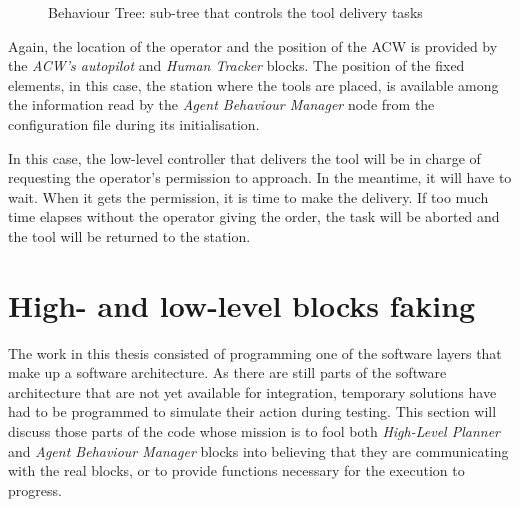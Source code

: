 \documentclass[fontsize=11pt, English=false, Español=true, Myfinal=true, twoside, numbers=noenddot]{scrbook}
\begin{document}
{\begin{figure}[ht]
\begin{center}
{\begin{tikzpicture}
		    \end{tikzpicture}}
		\caption{Behaviour Tree: sub-tree that controls the tool delivery tasks}
		\label{fig:DeliverToolTree}
	\end{center}
\end{figure}

Again, the location of the operator and the position of the \gls{ACW} is provided by the \emph{\gls{ACW}'s autopilot} and \emph{Human Tracker} blocks. The position of the fixed elements, in this case, the station where the tools are placed, is available among the information read by the \emph{Agent Behaviour Manager} node from the configuration file during its initialisation.

In this case, the low-level controller that delivers the tool will be in charge of requesting the operator's permission to approach. In the meantime, it will have to wait. When it gets the permission, it is time to make the delivery. If too much time elapses without the operator giving the order, the task will be aborted and the tool will be returned to the station.

\section{High- and low-level blocks faking}
\label{sec:faking}
The work in this thesis consisted of programming one of the software layers that make up a software architecture. As there are still parts of the software architecture that are not yet available for integration, temporary solutions have had to be programmed to simulate their action during testing. This section will discuss those parts of the code whose mission is to fool both \emph{High-Level Planner} and \emph{Agent Behaviour Manager} blocks into believing that they are communicating with the real blocks, or to provide functions necessary for the execution to progress.

}
\end{document}
